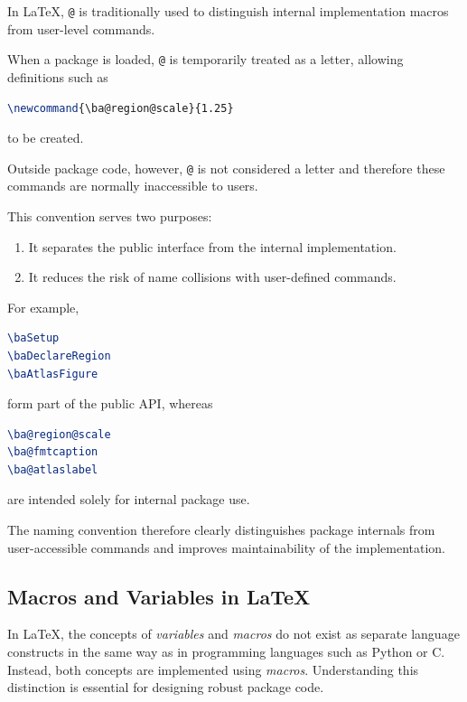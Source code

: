 In LaTeX, \lstinline|@| is traditionally used to distinguish internal implementation macros from user-level commands.

When a package is loaded, \lstinline|@| is temporarily treated as a letter, allowing definitions such as

\begin{lstlisting}[language={LaTeX}]
\newcommand{\ba@region@scale}{1.25}
\end{lstlisting}

to be created.

Outside package code, however, \lstinline|@| is not considered a letter and therefore these commands are normally inaccessible to users.

This convention serves two purposes:

\begin{enumerate}
\item It separates the public interface from the internal implementation.
\item It reduces the risk of name collisions with user-defined commands.
\end{enumerate}

For example,

\begin{lstlisting}[language={LaTeX}]
\baSetup
\baDeclareRegion
\baAtlasFigure
\end{lstlisting}

form part of the public API, whereas

\begin{lstlisting}[language={LaTeX}]
\ba@region@scale
\ba@fmtcaption
\ba@atlaslabel
\end{lstlisting}

are intended solely for internal package use.

The naming convention therefore clearly distinguishes package internals from user-accessible commands and improves maintainability of the implementation.

\subsection{Macros and Variables in \LaTeX}

In \LaTeX{}, the concepts of \emph{variables} and \emph{macros} do not exist as separate language constructs in the same way as in programming languages such as Python or C. Instead, both concepts are implemented using \emph{macros}. Understanding this distinction is essential for designing robust package code.


